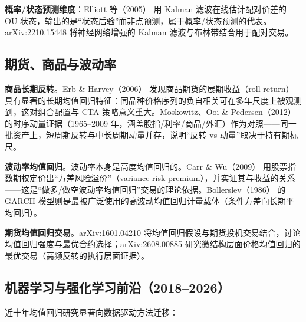 \documentclass[11pt,a4paper]{ctexart}
\begin{document}
\textbf{概率/状态预测维度}：Elliott 等（2005）\cite{elliott2005} 用 Kalman 滤波在线估计配对价差的 OU 状态，输出的是“状态后验”而非点预测，属于概率/状态预测的代表。arXiv:2210.15448 \cite{arxiv_neural_kalman} 将神经网络增强的 Kalman 滤波与布林带结合用于配对交易。

\subsection{期货、商品与波动率}\label{sec:futures}

\textbf{商品长期反转}。Erb \& Harvey（2006）\cite{erbharvey2006} 发现商品期货的展期收益（roll return）具有显著的长期均值回归特征：同品种价格序列的负自相关可在多年尺度上被观测到，这对组合配置与 CTA 策略意义重大。Moskowitz、Ooi \& Pedersen（2012）\cite{mom2012} 的时序动量证据（1965--2009 年，涵盖股指/利率/商品/外汇）作为对照——同一批资产上，短周期反转与中长周期动量并存，说明“反转 vs 动量”取决于持有期标尺。

\textbf{波动率均值回归}。波动率本身是高度均值回归的。Carr \& Wu（2009）\cite{carrwu2009} 用股票指数期权定价出“方差风险溢价”（variance risk premium），并实证其与收益的关系——这是“做多/做空波动率均值回归”交易的理论依据。Bollerslev（1986）\cite{bollerslev1986} 的 GARCH 模型则是最被广泛使用的高波动均值回归计量载体（条件方差向长期平均回归）。

\textbf{期货均值回归交易}。arXiv:1601.04210 \cite{arxiv_futures_mr} 将均值回归假设与期货投机交易结合，讨论均值回归强度与最优合约选择；arXiv:2608.00885 \cite{arxiv_microstructure} 研究微结构层面价格均值回归的最优交易（高频反转的执行层面证据）。

\subsection{机器学习与强化学习前沿（2018--2026）}\label{sec:ml}

近十年均值回归研究显著向数据驱动方法迁移：
\end{document}
